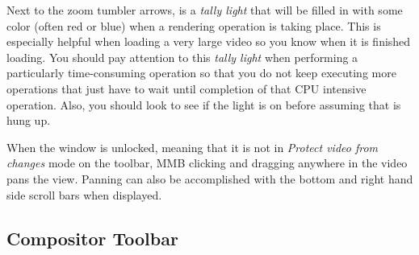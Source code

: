 Next to the zoom tumbler arrows, is a \textit{tally light} that will be filled in with some color
(often red or blue) when a rendering operation
is taking place. This is especially helpful when loading a very large video so you know
when it is finished loading.  You should pay attention to this \textit{tally light} when performing
a particularly time-consuming operation so that you do not keep executing more operations
that just have to wait until completion of that CPU intensive operation.  Also, you should look
to see if the light is on before assuming that \CGG{} is hung up.

When the window is unlocked, meaning that it is not in \textit{Protect video from changes} mode on the
toolbar, MMB clicking and dragging anywhere in the video pans the view.  Panning can also
be accomplished with the bottom and right hand side scroll bars when displayed.

\subsection{Compositor Toolbar}%
\label{sub:compositor_toolbar}

